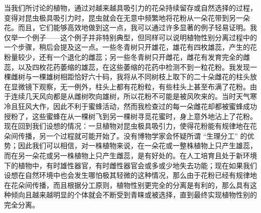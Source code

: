 \documentclass{article}
\begin{document}
当我们所讨论的植物，通过对越来越具吸引力的花朵持续留存或自然选择的过程，变得对昆虫极具吸引力时，昆虫就会在无意中频繁地将花粉从一朵花带到另一朵花。而且，它们能够高效地做到这一点，我可以通过许多显著的例子轻易证明。我仅举一个例子——这个例子并非特别典型，但同样可以说明植物性别分离过程中的一个步骤，稍后会提及这一点。一些冬青树只开雄花，雄花有四枚雄蕊，产生的花粉量较少，还有一个退化的雌蕊；另一些冬青树只开雌花，雌花有发育完全的雌蕊，以及四枚花药萎缩的雄蕊，在这些萎缩的花药中检测不到一粒花粉。我发现一棵雌树与一棵雄树相距恰好六十码，我将从不同树枝上取下的二十朵雌花的柱头放在显微镜下观察，无一例外，柱头上都有花粉粒，有些柱头上甚至布满了花粉。由于连续几天风向都是从雌树吹向雄树，所以花粉不可能是被风吹来的。当时天气寒冷且狂风大作，因此不利于蜜蜂活动，然而我检查过的每一朵雌花却都被蜜蜂成功授粉了，这些蜜蜂在从一棵树飞到另一棵树寻觅花蜜时，身上意外地沾上了花粉。现在回到我们设想的情况：一旦植物对昆虫极具吸引力，使得花粉能有规律地在花朵间传播，另一个过程就可能开始了。没有博物学家会怀疑所谓 “生理分工” 的优势；因此我们可以相信，对一株植物来说，在一朵花或一整株植物上只产生雄蕊，而在另一朵花或另一株植物上只产生雌蕊，是有好处的。在人工培育且处于新环境下的植物中，有时雄性器官，有时雌性器官会或多或少地失去功能；现在如果我们设想在自然环境中也会发生哪怕极其轻微的这种情况，那么由于花粉已经有规律地在花朵间传播，而且根据分工原则，植物性别更完全的分离是有利的，那么具有这种倾向且越来越明显的个体就会不断受到青睐或被选择，直到最终实现植物性别的完全分离。 \\
\end{document}
